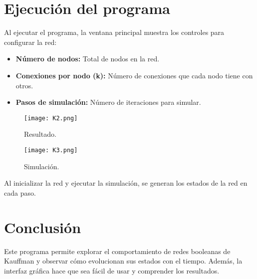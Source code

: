 \documentclass[12pt]{article}
\begin{document}
\section{Ejecución del programa}
Al ejecutar el programa, la ventana principal muestra los controles para configurar la red:
\begin{itemize}
    \item \textbf{Número de nodos:} Total de nodos en la red.
    \item \textbf{Conexiones por nodo (k):} Número de conexiones que cada nodo tiene con otros.
    \item \textbf{Pasos de simulación:} Número de iteraciones para simular.
\end{itemize}

\begin{figure}[h]
    \centering
    \begin{minipage}{0.45\textwidth}
        \centering
        \texttt{[image: K2.png]}
        \caption{Resultado.}
        \label{fig:resultado}
    \end{minipage}
    \hfill
    \begin{minipage}{0.45\textwidth}
        \centering
        \texttt{[image: K3.png]}
        \caption{Simulación.}
        \label{fig:simulacion}
    \end{minipage}
\end{figure}


\noindent Al inicializar la red y ejecutar la simulación, se generan los estados de la red en cada paso.

\section{Conclusión}
Este programa permite explorar el comportamiento de redes booleanas de Kauffman y observar cómo evolucionan sus estados con el tiempo. Además, la interfaz gráfica hace que sea fácil de usar y comprender los resultados.
\end{document}
